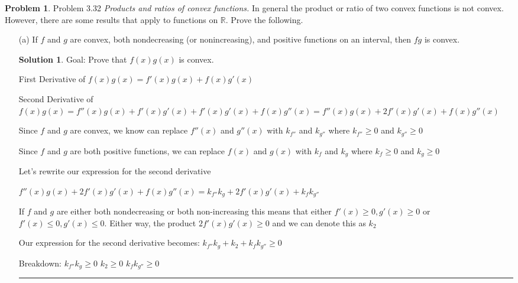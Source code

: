 \documentclass{article}
\theoremstyle{definition}
\newtheorem{problem}{Problem}
\def\fline{\rule{0.75\linewidth}{0.5pt}}
\newcommand{\finishline}{\begin{center}\fline\end{center}}
\newtheorem*{solution*}{Solution}
\newenvironment{solution}{\begin{solution*}}{{\finishline} \end{solution*}}
\begin{document}
\begin{problem} Problem 3.32
    \textit{Products and ratios of convex functions.} In general the product or ratio of two convex functions is not convex. However, there are some results that apply to functions on $\mathbb{R}$. Prove the following.

    \begin{itemize}
        \item[(a)] If $f$ and $g$ are convex, both nondecreasing (or nonincreasing), and positive functions on an interval, then $fg$ is convex.

        \begin{solution}
            Goal: Prove that $f(x) g(x)$ is convex. \newline 

            First Derivative of $f(x) g(x) = f'(x) g(x) + f(x) g'(x)$ \newline 

            Second Derivative of $f(x) g(x) = f''(x) g(x) + f'(x) g'(x) + f'(x) g'(x) + f(x) g''(x) = f''(x) g(x) + 2f'(x)g'(x) + f(x) g''(x)$

            Since $f$ and $g$ are convex, we know can replace $f''(x)$ and $g''(x)$ with $k_{f''}$ and $k_{g''}$ where $k_{f''} \geq 0$ and $k_{g''} \geq 0$

            Since $f$ and $g$ are both positive functions, we can replace $f(x)$ and $g(x)$ with $k_{f}$ and $k_{g}$ where $k_{f} \geq 0$ and $k_{g} \geq 0$

            Let's rewrite our expression for the second derivative \newline 

            $f''(x) g(x) + 2f'(x)g'(x) + f(x) g''(x) = k_{f''} k_{g} + 2f'(x)g'(x) + k_{f} k_{g''}$ \newline 

            If $f$ and $g$ are either both nondecreasing or both non-increasing this means that either $f'(x) \geq 0, g'(x) \geq 0$ or $f'(x) \leq 0, g'(x) \leq 0$. Either way, the product $2f'(x)g'(x) \geq 0$ and we can denote this as $k_2$

            Our expression for the second derivative becomes: \newline 
            $k_{f''} k_{g} + k_2 + k_{f} k_{g''} \geq 0$ \newline

            Breakdown: \newline 
            $k_{f''} k_{g} \geq 0$ \newline 
            $k_2 \geq 0$ \newline 
            $k_{f} k_{g''} \geq 0$ \newline 


\end{solution}
\end{itemize}
\end{problem}
\end{document}
